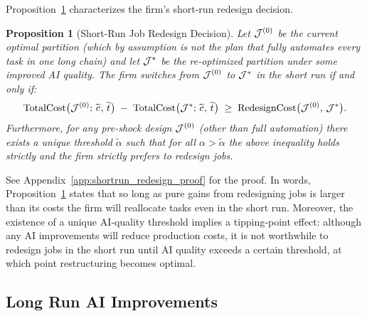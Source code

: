 \documentclass{article}
\theoremstyle{plain}
\theoremstyle{plain}
\newtheorem{proposition}[theorem]{Proposition}
\begin{document}
Proposition~\ref{prop:shortrun_redesign} characterizes the firm’s short-run redesign decision.
\begin{proposition}[Short-Run Job Redesign Decision] 
\label{prop:shortrun_redesign}
Let $\mathcal{J}^{(0)}$ be the current optimal partition (which by assumption is not the plan that fully automates every task in one long chain) and let $\mathcal{J}^*$ be the re-optimized partition under some improved AI quality.
The firm switches from $\mathcal{J}^{(0)}$ to $\mathcal{J}^*$ in the short run if and only if:
\[
\mathrm{TotalCost}\bigl(\mathcal{J}^{(0)};\,\widetilde{c_{}},\,\widetilde{t_{}}\bigr)
\;-\;
\mathrm{TotalCost}\bigl(\mathcal{J}^*;\,\widetilde{c_{}},\,\widetilde{t_{}}\bigr)
\;\ge\;
\mathrm{RedesignCost}\bigl(\mathcal{J}^{(0)},\,\mathcal{J}^*\bigr).
\]
Furthermore, for any pre-shock design $\mathcal{J}^{(0)}$ (other than full automation) there exists a unique threshold $\tilde{\alpha}$ such that for all $\alpha>\tilde{\alpha}$ the above inequality holds strictly and the firm strictly prefers to redesign jobs.
\end{proposition}
See Appendix~\ref{app:shortrun_redesign_proof} for the proof.
In words, Proposition~\ref{prop:shortrun_redesign} states that so long as pure gains from redesigning jobs is larger than its costs the firm will reallocate tasks even in the short run.
Moreover, the existence of a unique AI‐quality threshold implies a tipping‐point effect: although any AI improvements will reduce production costs, it is not worthwhile to redesign jobs in the short run until AI quality exceeds a certain threshold, at which point restructuring becomes optimal. 


\subsection{Long Run AI Improvements}  
\end{document}
